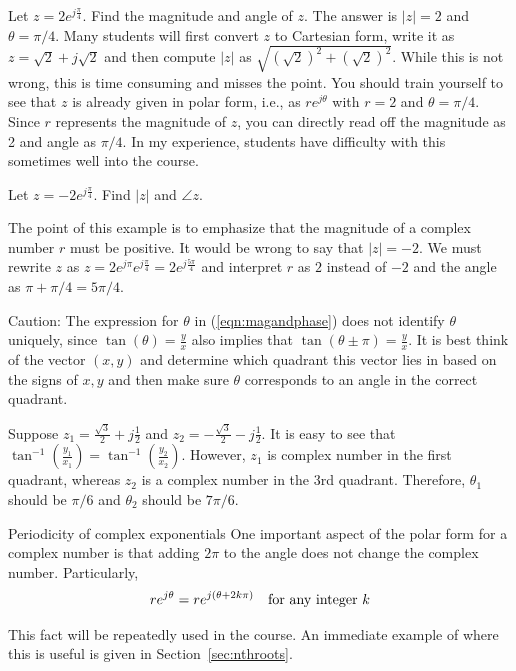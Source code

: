 \begin{example}
Let $z = 2 e^{j \frac{\pi}{4}}$. Find the magnitude and angle of $z$. The answer is $|z|=2$ and $\theta = \pi/4$. Many students will first convert $z$ to Cartesian form, write it as $z = \sqrt{2} + j \sqrt{2}$ and then compute $|z|$ as $\sqrt{(\sqrt{2})^2+(\sqrt{2})^2}$. While this is not wrong, this is time consuming and misses the point. You should train yourself to see that $z$ is already given in polar form, i.e., as $r e^{j \theta}$ with $r = 2$ and $\theta = \pi/4$. Since $r$ represents the magnitude of $z$, you can directly read off the magnitude as 2 and angle as $\pi/4$. In my experience, students have difficulty with this sometimes well into the course.
\end{example}

\begin{example}
Let $z = -2 e^{j \frac{\pi}{4}}$. Find $|z|$ and $\angle z$.

The point of this example is to emphasize that the magnitude of a complex number $r$ must be positive.
It would be wrong to say that $|z| = -2$.
We must rewrite $z$ as $z = 2 e^{j \pi} e^{j \frac{\pi}{4}} = 2 e^{j \frac{5 \pi}{4}}$ and interpret $r$ as $2$ instead of $-2$ and the angle as $\pi + \pi/4 = 5 \pi/4$.
\end{example}


Caution: The expression for $\theta$ in (\ref{eqn:magandphase}) does not identify $\theta$ uniquely, since $\tan(\theta) = \frac{y}{x}$ also implies
that $\tan(\theta \pm \pi) = \frac{y}{x}$. It is best think of the vector $(x,y)$ and determine which quadrant this vector
lies in based on the signs of $x,y$ and then make sure $\theta$ corresponds to an angle in the correct quadrant.


\begin{example}
Suppose $z_1 = \frac{\sqrt{3}}{2}+j\frac{1}{2}$ and $z_2 = -\frac{\sqrt{3}}{2}-j\frac{1}{2}$. It is easy to see that $\tan^{-1}\left(\frac{y_1}{x_1} \right)
= \tan^{-1}\left(\frac{y_2}{x_2} \right)$. However, $z_1$ is complex number in the first quadrant, whereas $z_2$ is a complex number in the 3rd quadrant. Therefore, $\theta_1$ should be $\pi/6$ and $\theta_2$ should be $7 \pi/6$.
\end{example}

\begin{infobox}{Periodicity of complex exponentials}
One important aspect of the polar form for a complex number is that adding $2 \pi$ to the angle does not change the complex number. Particularly,
\[
r e^{j\theta} = re^{j(\theta+2 k \pi)} \ \ \ \hbox{for any integer} \ k
\]
\end{infobox}
This fact will be repeatedly used in the course. An immediate example of where this is useful is given in Section~\ref{sec:nthroots}.


